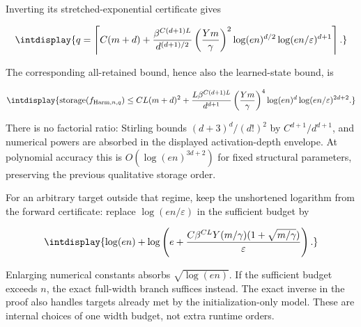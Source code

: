 
Inverting its stretched-exponential certificate gives


\begingroup\renewcommand{\theHequation}{intdisplay.24}
\begin{equation}
\intdisplay{
q=\left\lceil C(m+d)+
\frac{\beta^{C(d+1)L}}{d^{(d+1)/2}}
\left(\frac{Ym}{\gamma}\right)^2
\log(en)^{d/2}\log(en/\varepsilon)^{d+1}\right\rceil.
}
\label{int:eq-0021-harmonic-inverse}
\end{equation}
\endgroup


The corresponding all-retained bound, hence also the learned-state bound, is


\begingroup\renewcommand{\theHequation}{intdisplay.25}
\begin{equation}
\intdisplay{
\operatorname{storage}(f_{\mathrm{Harm},n,q})
\le CL(m+d)^2+
\frac{L\beta^{C(d+1)L}}{d^{d+1}}
\left(\frac{Ym}{\gamma}\right)^4
\log(en)^d\log(en/\varepsilon)^{2d+2}.
}
\label{int:eq-0022-harmonic-inverse-storage}
\end{equation}
\endgroup


There is no factorial ratio: Stirling bounds \((d+3)^d/(d!)^2\) by \(C^{d+1}/d^{d+1}\), and numerical powers are absorbed in the displayed activation-depth envelope. At polynomial accuracy this is \(O(\log(en)^{3d+2})\) for fixed structural parameters, preserving the previous qualitative storage order.



For an arbitrary target outside that regime, keep the unshortened logarithm from the forward certificate: replace \(\log(en/\varepsilon)\) in the sufficient budget by


\begingroup\renewcommand{\theHequation}{intdisplay.26}
\begin{equation}
\intdisplay{
\log(en)+\log\left(e+
\frac{C\beta^{CL}Y(m/\gamma)(1+\sqrt{m/\gamma})}{\varepsilon}\right).
}
\label{int:eq-0023-harmonic-inverse-logarithm}
\end{equation}
\endgroup


Enlarging numerical constants absorbs \(\sqrt{\log(en)}\). If the sufficient budget exceeds \(n\), the exact full-width branch suffices instead. The exact inverse in the proof also handles targets already met by the initialization-only model. These are internal choices of one width budget, not extra runtime orders.


